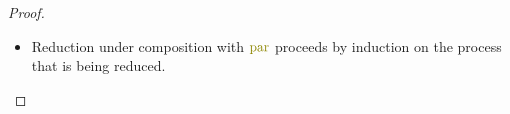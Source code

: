 \documentclass[a4paper,UKenglish,cleveref, autoref, thm-restate,authorcolumns]{lipics-v2019}
\theoremstyle{definition}
\newcommand{\type}[1]{\textcolor{blue}{\operatorname{#1}}}
\newcommand{\constr}[1]{\textcolor{olive}{\operatorname{#1}}}
\newcommand{\suc}{\constr{\scriptstyle 1+}}
\newcommand{\channel}[2]{\constr{C[} \; #1 \; \constr{\propto} \; #2 \; \constr{]}}
\newcommand{\comma}{\; \constr{,} \;}
\newcommand{\subst}[3]{#1 \; [ \; #2 \; / \;#3 \;]}
\newcommand{\li}{\ell_i}
\newcommand{\lo}{\ell_o}
\newcommand{\lz}{\ell_{\o}}
\newcommand{\lio}{\ell_{\#}}
\newcommand{\types}[4]{#1 \; \type{\propto} \; #2 \; \type{\vdash} \; #3 \; \type{\boxtimes} \; #4}
\newcommand{\contains}[6]{#1 \; \type{\propto} \; #2 \; \type{\ni}_{#3} \; #4 \; \type{\propto} \; #5 \; \type{\boxtimes} \; #6}
\newcommand{\containsusage}[4]{#1 \; \type{\ni}_{#2} \; #3 \; \type{\boxtimes} \; #4}
\begin{document}
\begin{proof}
\begin{itemize}
    \begin{figure}[h]
      \setlength{\mathindent}{0pt}
      \begin{subfigure}{.3\textwidth}
        \begin{alignat*}{2}
          \containsusage{&\Gamma'}{i}{\lio &&}{\Gamma} \\
          \contains{\gamma}{&\Gamma'}{i}{\channel{t}{m}}{\li &&}{\Psi} \\
          \types{\gamma \comma t}{&\Psi \comma m}{P &&}{\Delta \comma \lz} \\
          \contains{\gamma}{&\Delta }{i}{\channel{t}{m}}{\lo &&}{\Theta} \\
          \contains{\gamma}{&\Theta}{j}{t}{m &&}{\Xi}
        \end{alignat*}
        \caption{Initial assumptions.}
        \label{fig:subject-reduction:a}
      \end{subfigure}
      \begin{subfigure}{.5\textwidth}
        \begin{alignat*}{2}
          \types{\gamma \comma t}{& \Gamma \comma m}{P &&}{\Theta \comma \lz} \\
          \contains{\gamma}{& \Theta}{j}{t}{m &&}{\Xi}
        \end{alignat*}
        \caption{Rearrange $\lo$ witness, and merge with $\li$ witness into $\lio$.}
      \end{subfigure}
      \begin{subfigure}{.5\textwidth}
        \begin{align*}
          \types{\gamma \comma t}{\Gamma \comma m}{\subst{P}{\suc j}{\constr{zero}}}{\Xi \comma m}
        \end{align*}
        \caption{Substitution.}
      \end{subfigure}
      \begin{subfigure}{.5\textwidth}
        \begin{align*}
          \types{\gamma \comma t}{\Gamma \comma m}{lower_0 \; (\subst{P}{\suc j}{\constr{zero}})}{\Xi \comma m}
        \end{align*}
        \caption{Strengthening.}
      \end{subfigure}
      \caption{Proof steps for the $\constr{comm}$ case in subject reduction.}
    \end{figure}
  
    \item
    Reduction under composition with $\constr{par}$ proceeds by induction on the process that is being reduced.


\end{itemize}
\end{proof}
\end{document}
